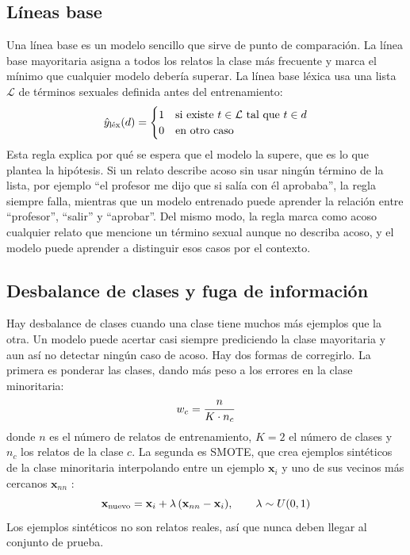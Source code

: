 \subsection{Líneas base}
Una línea base es un modelo sencillo que sirve de punto de comparación. La línea base mayoritaria asigna a todos los relatos la clase más frecuente y marca el mínimo que cualquier modelo debería superar. La línea base léxica usa una lista $\mathcal{L}$ de términos sexuales definida antes del entrenamiento:
\begin{equation}
\ecuacion{Regla de la línea base léxica}
\hat{y}_{\text{léx}}(d) =
\begin{cases}
1 & \text{si existe } t \in \mathcal{L} \text{ tal que } t \in d\\
0 & \text{en otro caso}
\end{cases}
\label{eq:lexica}
\end{equation}
Esta regla explica por qué se espera que el modelo la supere, que es lo que plantea la hipótesis. Si un relato describe acoso sin usar ningún término de la lista, por ejemplo \enquote{el profesor me dijo que si salía con él aprobaba}, la regla siempre falla, mientras que un modelo entrenado puede aprender la relación entre \enquote{profesor}, \enquote{salir} y \enquote{aprobar}. Del mismo modo, la regla marca como acoso cualquier relato que mencione un término sexual aunque no describa acoso, y el modelo puede aprender a distinguir esos casos por el contexto.

\subsection{Desbalance de clases y fuga de información}
Hay desbalance de clases cuando una clase tiene muchos más ejemplos que la otra. Un modelo puede acertar casi siempre prediciendo la clase mayoritaria y aun así no detectar ningún caso de acoso. Hay dos formas de corregirlo. La primera es ponderar las clases, dando más peso a los errores en la clase minoritaria:
\begin{equation}
\ecuacion{Peso de cada clase}
w_c = \frac{n}{K \cdot n_c}
\label{eq:pesos}
\end{equation}
donde $n$ es el número de relatos de entrenamiento, $K = 2$ el número de clases y $n_c$ los relatos de la clase $c$. La segunda es SMOTE, que crea ejemplos sintéticos de la clase minoritaria interpolando entre un ejemplo $\mathbf{x}_i$ y uno de sus vecinos más cercanos $\mathbf{x}_{nn}$ \citep{chawla2002}:
\begin{equation}
\ecuacion{Generación de ejemplos con SMOTE}
\mathbf{x}_{\text{nuevo}} = \mathbf{x}_i + \lambda\,(\mathbf{x}_{nn} - \mathbf{x}_i), \qquad \lambda \sim U(0,1)
\label{eq:smote}
\end{equation}
Los ejemplos sintéticos no son relatos reales, así que nunca deben llegar al conjunto de prueba.

